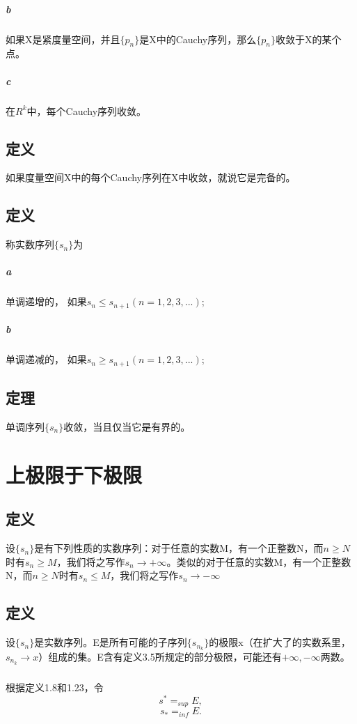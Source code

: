 \paragraph{b} 如果X是紧度量空间，并且$\{p_n\}$是X中的Cauchy序列，那么$\{p_n\}$收敛于X的某个点。
\paragraph{c} 在$R^k$中，每个Cauchy序列收敛。
\section{定义} 如果度量空间X中的每个Cauchy序列在X中收敛，就说它是完备的。
\section{定义} 称实数序列$\{ s_n \}$为
\paragraph{a} 单调递增的， 如果$s_n \le s_{n+1} ( n = 1, 2, 3, ... ) $;
\paragraph{b} 单调递减的， 如果$s_n \ge s_{n+1} ( n = 1, 2, 3, ... ) $;
\section{定理} 单调序列$\{ s_n \}$收敛，当且仅当它是有界的。
\subparagraph*{}
\chapter*{上极限于下极限}
\section{定义} 设$\{ s_n \}$是有下列性质的实数序列：对于任意的实数M，有一个正整数N，而$n \ge N$时有$s_n \ge M$，我们将之写作$s_n \to +\infty $。类似的对于任意的实数M，有一个正整数N，而$n \ge N$时有$s_n \le M$，我们将之写作$s_n \to -\infty $
\section{定义} 设$\{ s_n \}$是实数序列。E是所有可能的子序列$\{ s_{n_k} \}$的极限x（在扩大了的实数系里， $s_{n_k} \to x $）组成的集。E含有定义3.5所规定的部分极限，可能还有$+\infty, -\infty$两数。
\paragraph{} 根据定义1.8和1.23，令$$s^* = _{sup}E, $$ $$s_* = _{inf}E.$$
